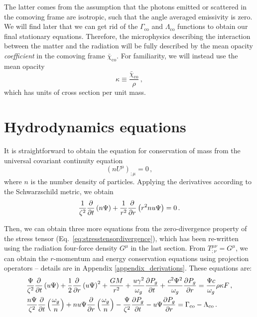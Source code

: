 \documentclass[../main.tex]{subfiles}
\begin{document}
The latter comes from the assumption that the photons emitted or scattered in the comoving frame are isotropic, such that the angle averaged emissivity is zero. We will find later that we can get rid of the $\Gamma_\text{co}$ and $\Lambda_\text{co}$ functions to obtain our final stationary equations.  Therefore, the microphysics describing the interaction between the matter and the radiation will be fully described by the mean opacity \textit{coefficient} in the comoving frame $\bar{\chi}_\text{co}$.  For familiarity, we will instead use the mean opacity
\begin{equation}
    \kappa\equiv \frac{\bar{\chi}_\text{co}}{\rho} \,,
\end{equation}
which has units of cross section per unit mass. 

\section{Hydrodynamics equations}\label{sec:hydrodynamics_eqs}
It is straightforward to obtain the equation for conservation of mass from the universal covariant continuity equation
\begin{equation}
    (nU^\mu)_{;\mu}=0 \,,
\end{equation}
where $n$ is the number density of particles. Applying the derivatives according to the Schwarzschild metric, we obtain
\begin{equation}\label{eq:masscons}
\frac{1}{\zeta^2}\frac{\partial}{\partial t}\left(n\Psi\right)+\frac{1}{r^2}\frac{\partial}{\partial r}\left(r^2n u\Psi\right) = 0 \,.
\end{equation}

Then, we can obtain three more equations from the zero-divergence property of the stress tensor (Eq.~\ref{eq:stresstensordivergence}), which has been re-written using the radiation four-force density $G^\mu$ in the last section. From $T^{\mu\nu}_{;\nu}=G^\mu$, we can obtain the $r$-momentum and energy conservation equations using projection operators -- details are in Appendix \ref{appendix_derivations}.  These equations are: 
\begin{align}
    &\frac{\Psi}{\zeta^2}\frac{\partial}{\partial t}\left(u \Psi\right)+\frac{1}{2}\frac{\partial}{\partial r}\left(u\Psi\right)^2+\frac{GM}{r^2} +\frac{u\gamma^2}{\omega_g}\frac{\partial P_g}{\partial t} +\frac{c^2\Psi^2}{\omega_g}\frac{\partial P_g}{\partial r} = \frac{\Psi c}{\omega_g}\rho\kappa F\label{eq:momcons}\,,\\
    &\frac{n\Psi}{\zeta^2}\frac{\partial}{\partial t}\left(\frac{\omega_g}{n}\right)+n u\Psi\frac{\partial}{\partial r}\left(\frac{\omega_g}{n}\right)-\frac{\Psi}{\zeta^2}\frac{\partial P_g}{\partial t}-u\Psi\frac{\partial P_g}{\partial r}=\Gamma_\text{co}-\Lambda_\text{co}\,.\label{eq:enercons}
\end{align}
\end{document}
